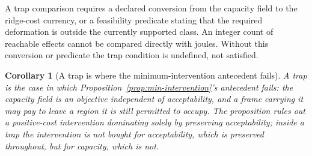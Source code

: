 \documentclass[11pt,a4paper]{article}
\newtheorem{corollary}[definition]{Corollary}
\theoremstyle{remark}
\begin{document}
A trap comparison requires a declared conversion from the capacity field to
the ridge-cost currency, or a feasibility predicate stating that the required
deformation is outside the currently supported class. An integer count of
reachable effects cannot be compared directly with joules. Without this
conversion or predicate the trap condition is undefined, not satisfied.



\begin{corollary}[A trap is where the minimum-intervention antecedent fails]\label{cor:trap-antecedent}
A trap is the case in which Proposition~\ref{prop:min-intervention}'s antecedent fails: the capacity
field is an objective independent of acceptability, and a frame carrying it may pay to leave a region
it is still permitted to occupy. The proposition rules out a positive-cost intervention dominating
\emph{solely by preserving acceptability}; inside a trap the intervention is not bought for
acceptability, which is preserved throughout, but for capacity, which is not.
\end{corollary}
\end{document}
